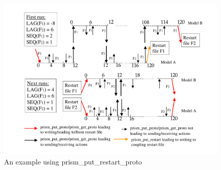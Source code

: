 \begin{figure}
\includegraphics[scale=.6]{figures/restart_example} 
\caption{An example using prism\_put\_restart\_proto}
\label{restart_ex}
\end{figure} 

